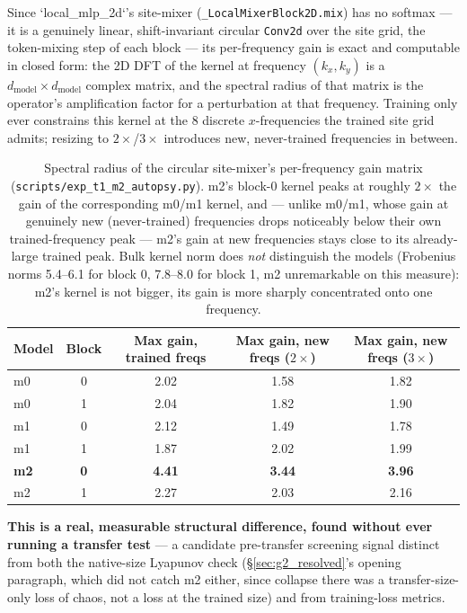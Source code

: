 \documentclass[11pt]{article}
\begin{document}
Since `local\_mlp\_2d`'s site-mixer (\texttt{\_LocalMixerBlock2D.mix}) has
no softmax --- it is a genuinely linear, shift-invariant circular
\texttt{Conv2d} over the site grid, the token-mixing step of each block
--- its per-frequency gain is exact and computable in closed form: the
2D DFT of the kernel at frequency $(k_x,k_y)$ is a
$d_{\mathrm{model}}\times d_{\mathrm{model}}$ complex matrix, and the
spectral radius of that matrix is the operator's amplification factor for
a perturbation at that frequency. Training only ever constrains this
kernel at the 8 discrete $x$-frequencies the trained site grid admits;
resizing to $2\times$/$3\times$ introduces new, never-trained
frequencies in between.

\begin{table}[h]
\centering
\begin{tabular}{lcccc}
\toprule
Model & Block & Max gain, trained freqs & Max gain, new freqs ($2\times$) & Max gain, new freqs ($3\times$) \\
\midrule
m0 & 0 & 2.02 & 1.58 & 1.82 \\
m0 & 1 & 2.04 & 1.82 & 1.90 \\
m1 & 0 & 2.12 & 1.49 & 1.78 \\
m1 & 1 & 1.87 & 2.02 & 1.99 \\
\textbf{m2} & \textbf{0} & \textbf{4.41} & \textbf{3.44} & \textbf{3.96} \\
m2 & 1 & 2.27 & 2.03 & 2.16 \\
\bottomrule
\end{tabular}
\caption{Spectral radius of the circular site-mixer's per-frequency gain
matrix (\texttt{scripts/exp\_t1\_m2\_autopsy.py}). m2's block-0 kernel peaks at roughly $2\times$ the gain
of the corresponding m0/m1 kernel, and --- unlike m0/m1, whose gain at
genuinely new (never-trained) frequencies drops noticeably below their
own trained-frequency peak --- m2's gain at new frequencies stays close
to its already-large trained peak. Bulk kernel norm does \emph{not}
distinguish the models (Frobenius norms 5.4--6.1 for block 0, 7.8--8.0
for block 1, m2 unremarkable on this measure): m2's kernel is not bigger,
its gain is more sharply concentrated onto one frequency.}
\label{tab:m2_gain}
\end{table}

\textbf{This is a real, measurable structural difference, found without
ever running a transfer test} --- a candidate pre-transfer screening
signal distinct from both the native-size Lyapunov check
(\S\ref{sec:g2_resolved}'s opening paragraph, which did not catch m2
either, since collapse there was a transfer-size-only loss of chaos, not
a loss at the trained size) and from training-loss metrics.
\end{document}
